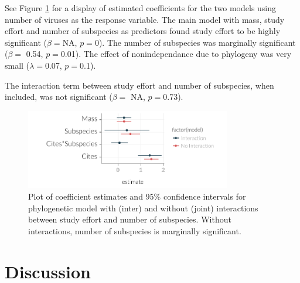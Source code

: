 See Figure \ref{fig:plotSubspeciesCoefs} for a display of estimated coefficients for the two models using number of viruses as the response variable. 
The main model with mass, study effort and number of subspecies as predictors found study effort to be highly significant ($\beta = $NA, $p = $0). 
The number of subspecies was marginally significant ($\beta = $ 0.54, $p = $0.01). 
The effect of nonindependance due to phylogeny was very small ($\lambda = $0.07, $p = $0.1).

The interaction term between study effort and number of subspecies, when included, was not significant ($\beta = $ NA, $p = $0.73).





\begin{knitrout}\footnotesize
{}\color{fgcolor}\begin{figure}[t]

{\centering \includegraphics[width=0.8\textwidth]{figure/plotSubspeciesCoefs-1} 

}

\caption[
Plot of coefficient estimates and 95\% confidence intervals for phylogenetic model with (inter) and without (joint) interactions between study effort and number of subspecies]{
Plot of coefficient estimates and 95\% confidence intervals for phylogenetic model with (inter) and without (joint) interactions between study effort and number of subspecies. 
Without interactions, number of subspecies is marginally significant.
}\label{fig:plotSubspeciesCoefs}
\end{figure}


\end{knitrout}











\clearpage
\section{Discussion}  










